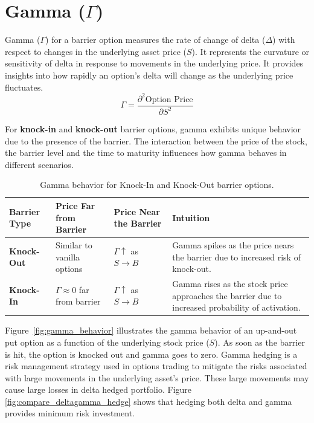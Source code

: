 \section{Gamma (\(\Gamma\))}

Gamma (\(\Gamma\)) for a barrier option measures the rate of change of delta (\(\Delta\)) with respect to changes in the underlying asset price (\(S\)). It represents the curvature or sensitivity of delta in response to movements in the underlying price. It provides insights into how rapidly an option's delta will change as the underlying price fluctuates.
\[
\Gamma = \frac{\partial^2 \text{Option Price}}{\partial S^2}
\]

For \textbf{knock-in} and \textbf{knock-out} barrier options, gamma exhibits unique behavior due to the presence of the barrier. The interaction between the price of the stock, the barrier level and the time to maturity influences how gamma behaves in different scenarios.

\begin{center}
	\begin{table}[H]
		\begin{tabular}{ | m{3cm} | m{5cm}| m{4cm} | m{4cm}|} 
			\hline
			\textbf{Barrier Type} & \textbf{Price Far from Barrier} & \textbf{Price Near the Barrier} & \textbf{Intuition}  \\ 
			\hline
			\textbf{Knock-Out} & Similar to vanilla options     & $\Gamma \uparrow$ as $S \to B$  & Gamma spikes as the price nears the barrier due to increased risk of knock-out. \\ 
			\hline
			\textbf{Knock-In}    & $\Gamma \approx 0$ far from barrier   & $\Gamma \uparrow$ as $S \to B$  & Gamma rises as the stock price approaches the barrier due to increased probability of activation. \\ 
			\hline
		\end{tabular}
		\caption{Gamma behavior for Knock-In and Knock-Out barrier options.}
		\label{tab:gamma_barrier_options}
	\end{table}
\end{center}

Figure~\ref{fig:gamma_behavior} illustrates the gamma behavior of an up-and-out put option as a function of the underlying stock price (\(S\)). As soon as the barrier is hit, the option is knocked out and gamma goes to zero. Gamma hedging is a risk management strategy used in options trading to mitigate the risks associated with large movements in the underlying asset's price. These large movements may cause large losses in delta hedged portfolio. Figure \ref{fig:compare_deltagamma_hedge} shows that hedging both delta and gamma provides minimum risk investment.

